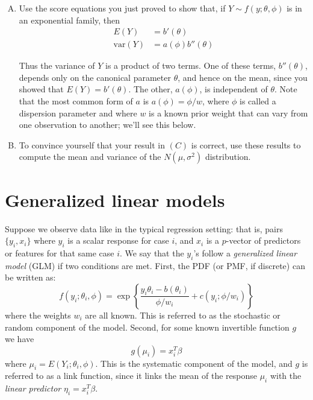 \documentclass{mynotes}
\begin{document}
\begin{enumerate}[(A)]
\item Use the score equations you just proved to show that, if $Y \sim f(y; \theta, \phi)$ is in an exponential family, then
$$
\begin{aligned}
E(Y) &=  b'(\theta) \\
\mbox{var} ( Y ) &= a(\phi) b''(\theta) 
\end{aligned}
$$

Thus the variance of $Y$ is a product of two terms.  One of these terms, $b''(\theta)$, depends only on the canonical parameter $\theta$, and hence on the mean, since you showed that $E(Y) =  b'(\theta)$.  The other, $a(\phi)$, is independent of $\theta$.  Note that the most common form of $a$ is $a(\phi) = \phi/w$, where $\phi$ is called a dispersion parameter and where $w$ is a known prior weight that can vary from one observation to another; we'll see this below.  

\item To convince yourself that your result in $(C)$ is correct, use these results to compute the mean and variance of the $N(\mu, \sigma^2)$ distribution.  

\end{enumerate}


\section{Generalized linear models}  

Suppose we observe data like in the typical regression setting: that is, pairs $\{y_i, x_i\}$ where $y_i$ is a scalar response for case $i$, and $x_i$ is a $p$-vector of predictors or features for that same case $i$.  We say that the $y_i$'s follow a \textit{generalized linear model} (GLM) if two conditions are met.  First, the PDF (or PMF, if discrete) can be written as:  
$$
f(y_i; \theta_i,  \phi)  = \exp \left\{ \frac{y_i \theta_i - b(\theta_i)}{\phi/w_i} + c(y_i; \phi/w_i)   \right \}
$$
where the weights $w_i$ are all known.  This is referred to as the stochastic or random component of the model.  Second, for some known invertible function $g$ we have
$$
g(\mu_i) = x_i^T \beta
$$
where $\mu_i = E(Y_i; \theta_i, \phi)$.  This is the systematic component of the model, and $g$ is referred to as a link function, since it links the mean of the response $\mu_i$ with the \emph{linear predictor} $\eta_i = x_i^T \beta$.  
\end{document}

